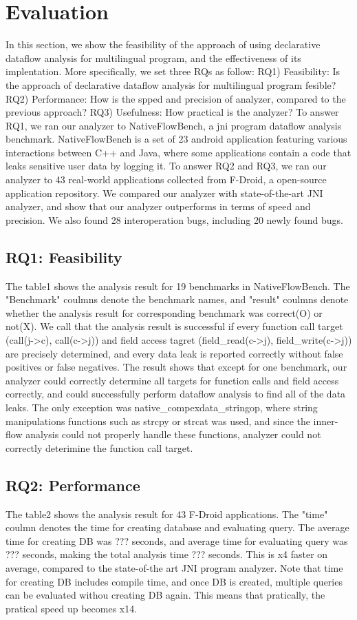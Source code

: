 \section{Evaluation}
In this section, we show the feasibility of the approach of using declarative
dataflow analysis for multilingual program, and the effectiveness of its
implentation. More specifically, we set three RQs as follow: RQ1) Feasibility:
Is the approach of declarative dataflow analysis for multilingual program
fesible?  RQ2) Performance: How is the spped and precision of analyzer,
compared to the previous approach?  RQ3) Usefulness: How practical is the
analyzer?  To answer RQ1, we ran our analyzer to NativeFlowBench, a jni program
dataflow analysis benchmark.  NativeFlowBench is a set of 23 android
application featuring various interactions between C++ and Java, where some
applications contain a code that leaks sensitive user data by logging it.  To
answer RQ2 and RQ3, we ran our analyzer to 43 real-world applications collected
from F-Droid, a open-source application repository. We compared our analyzer
with state-of-the-art JNI analyzer, and show that our analyzer outperforms in
terms of speed and precision. We also found 28 interoperation bugs, including
20 newly found bugs.


\subsection{RQ1: Feasibility}
The table1 shows the analysis result for 19 benchmarks in NativeFlowBench.  The
"Benchmark" coulmns denote the benchmark names, and "result" coulmns denote
whether the analysis result for corresponding benchmark was correct(O) or
not(X). We call that the analysis result is successful if every function call
target (call(j->c), call(c->j)) and field access tagret (field\_read(c->j),
field\_write(c->j)) are precisely determined, and every data leak is reported
correctly without false positives or false negatives.  The result shows that
except for one benchmark, our analyzer could correctly determine all targets
for function calls and field access correctly, and could successfully perform
dataflow analysis to find all of the data leaks. The only exception was
native\_compexdata\_stringop, where string manipulations functions such as
strcpy or strcat was used, and since the inner-flow analysis could not
properly handle these functions, analyzer could not correctly deterimine the
function call target.

\subsection{RQ2: Performance}
The table2 shows the analysis result for 43 F-Droid applications. The "time" coulmn denotes
the time for creating database and evaluating query. The average time for creating DB was
??? seconds, and average time for evaluating query was ??? seconds, making the total analysis time
??? seconds. This is x4 faster on average, compared to the state-of-the art JNI program analyzer.
Note that time for creating DB includes compile time, and once DB is created, multiple queries can
be evaluated withou creating DB again. This means that pratically, the pratical speed up becomes x14.


